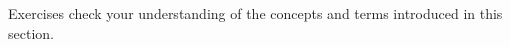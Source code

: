 {\noindent Exercises}
{ check your understanding of the concepts and terms introduced in this section.}

